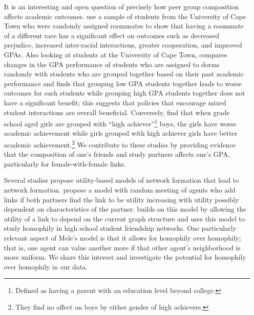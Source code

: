 \documentclass[12pt,letterpaper,english]{article}
\begin{document}
It is an interesting and open question of precisely how peer group composition affects academic outcomes. \cite{burns2015interaction} use a sample of students from the University of Cape Town who were randomly assigned roommates to show that having a roommate of a different race has a significant effect on outcomes such as decreased prejudice, increased inter-racial interactions, greater cooperation, and improved GPAs. Also looking at students at the University of Cape Town, \cite{garlick2018academic} compares changes in the GPA performance of students who are assigned to dorms randomly with students who are grouped together based on their past academic performance and finds that grouping low GPA students together leads to worse outcomes for such students while grouping high GPA students together does not have a significant benefit; this suggests that policies that encourage mixed student interactions are overall beneficial. Conversely, \cite{cools2019girls} find that when grade school aged girls are grouped with ``high achiever''\footnote{Defined as having a parent with an education level beyond college.} boys, the girls have worse academic achievement while girls grouped with high achiever girls have better academic achievement.\footnote{They find no affect on boys by either gender of high achievers.} We contribute to these studies by providing evidence that the composition of one's friends and study partners affects one's GPA, particularly for female-with-female links.

Several studies propose utility-based models of network formation that lead to network formation. \cite{christakis2010empirical} propose a model with random meeting of agents who add links if both partners find the link to be utility increasing with utility possibly dependent on characteristics of the partner. \cite{mele2017structural,mele2017segregation} builds on this model by allowing the utility of a link to depend on the current graph structure and uses this model to study homophily in high school student friendship networks. One particularly relevant aspect of Mele's model is that it allows for homophily over homophily; that is, one agent can value another more if that other agent's neighborhood is more uniform. We share this interest and investigate the potential for homophily over homophily in our data. %
\end{document}
